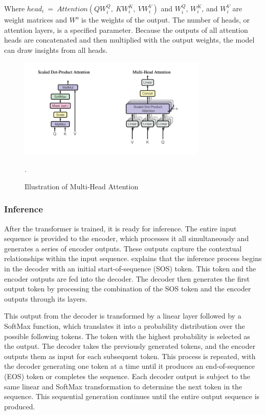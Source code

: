 \documentclass[12pt,a4paper]{article}
\begin{document}
Where ${head}_i\ =\ Attention\left(QW_i^Q,\ KW_i^K,\ VW_i^V\right)$ and $W_i^Q$, $W_i^K$, and $W_i^V$ are weight matrices and $W^o$ is the weights of the output. The number of heads, or attention layers, is a specified parameter. Because the outputs of all attention heads are concatenated and then multiplied with the output weights, the model can draw insights from all heads. 

\begin{figure}[htbp]
  \centering
  \includegraphics[width=0.8\textwidth]{attention.png}
  \caption{Illustration of Multi-Head Attention \parencite{Vaswani2017}}.
  \label{multiheadattention}
\end{figure}

\subsubsection{Inference}
After the transformer is trained, it is ready for inference. The entire input sequence is provided to the encoder, which processes it all simultaneously and generates a series of encoder outputs. These outputs capture the contextual relationships within the input sequence. \cite{youtube} explains that the inference process begins in the decoder with an initial start-of-sequence (SOS) token. This token and the encoder outputs are fed into the decoder. The decoder then generates the first output token by processing the combination of the SOS token and the encoder outputs through its layers.

This output from the decoder is transformed by a linear layer followed by a SoftMax function, which translates it into a probability distribution over the possible following tokens. The token with the highest probability is selected as the output. The decoder takes the previously generated tokens, and the encoder outputs them as input for each subsequent token. This process is repeated, with the decoder generating one token at a time until it produces an end-of-sequence (EOS) token or completes the sequence. Each decoder output is subject to the same linear and SoftMax transformation to determine the next token in the sequence. This sequential generation continues until the entire output sequence is produced.
\end{document}
